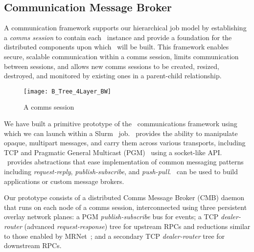 \subsection{Communication Message Broker}


A communication framework supports our hierarchical job model
by establishing a {\em comms session} to contain each \flux\ instance
and provide a foundation for the distributed components upon which
\flux\ will be built.
This framework enables secure, scalable communication
within a comms session, limits communication between sessions,
and allows new comms sessions to be created, resized, destroyed,
and monitored by existing ones in a parent-child relationship.

\begin{figure}
\vspace{-.5cm}
\centering
\texttt{[image: B\_Tree\_4Layer\_BW]}
\caption{A comms session} 
\vspace{-.5cm}
\label{fig:commswireup}
\end{figure}

We have built a primitive prototype of the \flux\ communications framework
using \zMQ~\cite{ZMQGuide} which we can launch within a
Slurm~\cite{Jette02slurm} job.
\zMQ\ provides the ability to manipulate opaque,
multipart messages, and carry them across various transports, including
TCP and Pragmatic General Multicast (PGM)~\cite{rfc3208}
using a socket-like API.
\zMQ\ provides abstractions that ease implementation of common
messaging patterns including {\em request-reply}, {\em publish-subscribe},
and {\em push-pull}.
\zMQ\ can be used to build applications or custom message brokers.


Our prototype consists of a distributed Comms Message Broker (CMB)
daemon that runs on each node of a comms session, interconnected using
three persistent overlay network planes:
a PGM {\em publish-subscribe} bus for events; 
a TCP {\em dealer-router} (advanced {\em request-response})
tree for upstream RPCs and reductions
similar to those enabled by MRNet~\cite{mrnet}; and
a secondary TCP {\em dealer-router} tree for downstream RPCs.


